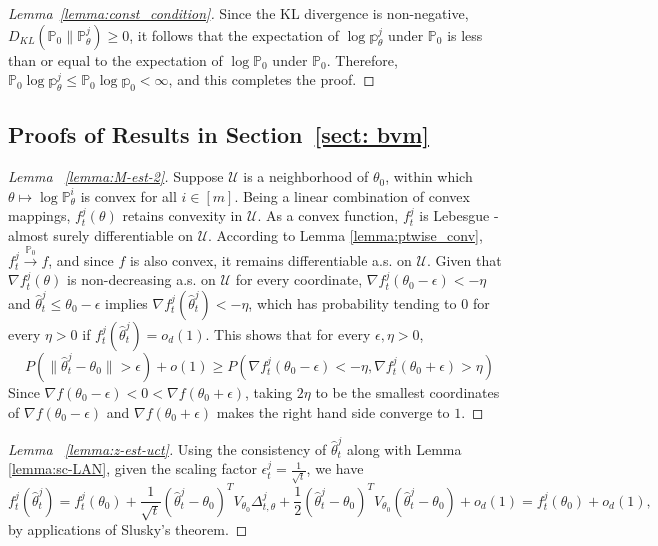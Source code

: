 \documentclass[twoside,11pt]{article}
\numberwithin{equation}{section}
\newcommand{\U}{\mathcal{U}}
\newcommand\bP{\mathbb{P}}
\newcommand\bp{\mathbb{p}}
\newcommand{\pto}{\stackrel{\bP_0}{\to}}
\begin{document}
{\begin{proof}[Lemma~\ref{lemma:const_condition}]
Since the KL divergence is non-negative, $D_{KL}(\bP_0 \parallel \bP_\theta^j) \geq 0$, it follows that the expectation of $\log \bp_\theta^j$ under $\bP_0$ is less than or equal to the expectation of $\log \bP_0$ under $\bP_0$. Therefore, $\bP_0 \log \bp_\theta^j \leq \bP_0 \log \bp_0 < \infty$, and this completes the proof. 
\end{proof}
\subsection{Proofs of Results in Section~\ref{sect: bvm}} \label{app: bvm}
\begin{proof}[Lemma ~\ref{lemma:M-est-2}]
Suppose $\U$ is a neighborhood of $\theta_0$, within which $\theta \mapsto \log \bP_\theta^i$ is convex for all $i \in [m]$. Being a linear combination of convex mappings, $f_t^j(\theta)$ retains convexity in $\U$. As a convex function, $f_t^j$ is Lebesgue - almost surely differentiable on $\U$. According to Lemma \ref{lemma:ptwise_conv}, $f_t^j \pto f$, and since $f$ is also convex, it remains differentiable a.s. on $\U$.  Given that $\nabla f_t^j(\theta)$ is non-decreasing a.s. on $\U$ for every coordinate, $\nabla f_t^j(\theta_0 - \epsilon) < - \eta$ and $\hat \theta_t^j \leq \theta_0 - \epsilon$ implies $\nabla f_t^j(\hat \theta_t^j) < - \eta$, which has probability tending to $0$ for every $\eta > 0$ if $f_t^j(\hat \theta_t^j) = o_d(1)$. This shows that for every $\epsilon, \eta > 0$, 
\begin{equation*}
    P( \|\hat \theta_t^j - \theta_0 \| > \epsilon) + o(1) \geq  P( \nabla f_t^j(\theta_0 - \epsilon) < -\eta,\nabla f_t^j(\theta_0 + \epsilon) > \eta )
\end{equation*}
Since $\nabla f(\theta_0 - \epsilon) < 0 < \nabla f(\theta_0 + \epsilon)$, taking $2 \eta$ to be the smallest coordinates of $\nabla f(\theta_0 - \epsilon)$ and $\nabla f(\theta_0 + \epsilon)$ makes the right hand side converge to $1$. 

\end{proof}
\begin{proof}[Lemma ~\ref{lemma:z-est-uct}]
Using the consistency of $\hat \theta_t^j$ along with Lemma \ref{lemma:sc-LAN}, given the scaling factor $\epsilon_t^j = \frac{1}{\sqrt{t}} $, we have
\begin{equation*}
f_t^j(\hat\theta_t^j) = f_t^j(\theta_0) + \frac{1}{\sqrt{t}} (\hat \theta_t^j - \theta_0)^T V_{\theta_0} \Delta_{t, \theta}^j + \frac{1}{2} (\hat \theta_t^j - \theta_0)^T V_{\theta_0} (\hat \theta_t^j - \theta_0) + o_d(1) = f_t^j(\theta_0) + o_d(1),
\end{equation*}
by applications of Slusky's theorem.


\end{proof}}
\end{document}
